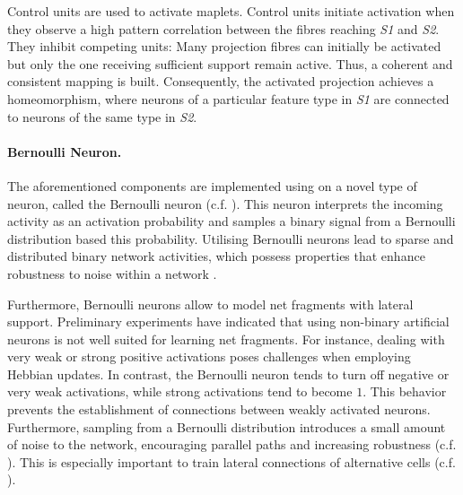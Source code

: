 Control units are used to activate maplets.
Control units initiate activation when they observe a high pattern correlation between the fibres reaching \emph{S1} and \emph{S2}. They inhibit competing units: Many projection fibres can initially be activated but only the one receiving sufficient support remain active. Thus, a coherent and consistent mapping is built.
Consequently, the activated projection achieves a homeomorphism, where neurons of a particular feature type in \emph{S1} are connected to neurons of the same type in \emph{S2}.

\paragraph{Bernoulli Neuron.} The aforementioned components are implemented using on a novel type of neuron, called the Bernoulli neuron (c.f. ). This neuron interprets the incoming activity as an activation probability and samples a binary signal from a Bernoulli distribution based this probability. Utilising Bernoulli neurons lead to sparse and distributed binary network activities, which possess properties that enhance robustness to noise within a network .

Furthermore,  Bernoulli neurons allow to model net fragments with lateral support. Preliminary experiments have indicated that using non-binary artificial neurons is not well suited for learning net fragments. For instance, dealing with very weak or strong positive activations poses challenges when employing Hebbian updates. In contrast, the Bernoulli neuron tends to turn off negative or very weak activations, while strong activations tend to become $1$. This behavior prevents the establishment of connections between weakly activated neurons. Furthermore, sampling from a Bernoulli distribution introduces a small amount of noise to the network, encouraging parallel paths and increasing robustness (c.f. ). This is especially important to train lateral connections of alternative cells (c.f. ).


